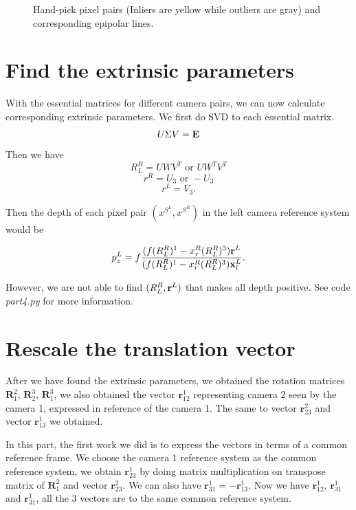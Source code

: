\documentclass[10pt,twocolumn,letterpaper]{article}
\begin{document}
\begin{figure}[t]
{}

\caption{Hand-pick pixel pairs (Inliers are yellow while outliers are gray) and corresponding epipolar lines.}
\label{fig:epipolar}
\end{figure}

\section{Find the extrinsic parameters}

With the essential matrices for different camera pairs, we can now calculate corresponding extrinsic parameters. We first do SVD to each essential matrix.
$$ U\Sigma V = {\textbf E} $$
Then we have $$R^R_L = UWV^T \text{ or } UW^TV^T$$
$$ r^R = U_3 \text{ or } -U_3$$
$$ r^L = V_3.$$ 

Then the depth of each pixel pair $(x^{S^L}, x^{S^R})$ in the left camera reference system would be

$$ p^L_z = f\frac{(f(R^R_L)^1 - x^R_r(R^R_L)^3){\textbf r}^L}{(f(R^R_L)^1 - x^R_r(R^R_L)^3){\textbf x}^L_l}. $$

However, we are not able to find $(R^R_L, {\textbf r}^L)$ that makes all depth positive. See code \textit{part4.py} for more information.



\section{Rescale the translation vector}
After we have found the extrinsic parameters, we obtained the rotation matrices $\textbf{R}_{1}^{2}$, $\textbf{R}_{2}^{3}$, $\textbf{R}_{1}^{3}$, we also obtained the vector $\textbf{r}_{12}^{1}$ representing camera 2 seen by the camera 1, expressed in reference of the camera 1. The same to vector $\textbf{r}_{23}^{2}$ and vector $\textbf{r}_{13}^{1}$ we obtained.

In this part, the first work we did is to express the vectors in terms of a common reference frame. We choose the camera 1 reference system as the common reference system, we obtain $\textbf{r}_{23}^{1}$ by doing matrix multiplication on transpose matrix of $\textbf{R}_{1}^{2}$ and vector $\textbf{r}_{23}^{2}$. We can also have $\textbf{r}_{31}^{1} = - \textbf{r}_{13}^{1}$. Now we have $\textbf{r}_{12}^{1}$, $\textbf{r}_{31}^{1}$ and $\textbf{r}_{31}^{1}$, all the 3 vectors are to the same common reference system.
\end{document}
